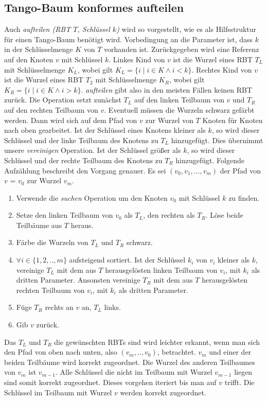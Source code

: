 \documentclass[a4paper,12pt]{article}
\begin{document}
\subsection{Tango-Baum konformes aufteilen}
Auch \textit{aufteilen (RBT $T$, Schlüssel $k$)} wird so vorgestellt, wie es als Hilfsstruktur für einen Tango-Baum benötigt wird. Vorbedingung an die Parameter ist, dass $k$ in der Schlüsselmenge $K$ von $T$ vorhanden ist. Zurückgegeben wird eine Referenz auf den Knoten $v$ mit Schlüssel $k$. Linkes Kind von $v$ ist die Wurzel eines RBT $T_L$ mit Schlüsselmenge $K_L$, wobei gilt ${K_L=\{i \mid  i\in K \land i <k\}}$. Rechtes Kind von $v$ ist die Wurzel eines RBT $T_2$ mit Schlüsselmenge $K_R$, wobei gilt ${K_R = \{i \mid i\in K \land i > k\}}$. \textit{aufteilen} gibt also in den meisten Fällen keinen RBT zurück. Die Operation setzt zunächst $T_L$ auf den linken Teilbaum von $v$ und $T_R$ auf den rechten Teilbaum von $v$. Eventuell müssen die Wurzeln schwarz gefärbt werden. Dann wird sich auf dem Pfad von $v$ zur Wurzel von $T$ Knoten für Knoten nach oben gearbeitet. Ist der Schlüssel eines Knotens kleiner als $k$, so wird dieser Schlüssel und der linke Teilbaum des Knotens zu $T_L$ hinzugefügt. Dies übernimmt unsere \textit{vereinigen} Operation. Ist der Schlüssel größer als $k$, so wird dieser Schlüssel und der rechte Teilbaum des Knotens zu $T_R$ hinzugefügt. Folgende Aufzählung beschreibt den Vorgang genauer.
Es sei $(v_0, v_1,...,v_m) $ der Pfad von $v$ = $v_0$ zur Wurzel $v_m$.
\begin{enumerate}
	\item Verwende die \textit{suchen} Operation um den Knoten $v_0$ mit Schlüssel $k$ zu finden.
	\item Setze den linken Teilbaum von $v_0$ als $T_L$, den rechten als $T_R$. Löse beide Teilbäume aus $T$ heraus.
	\item Färbe die Wurzeln von $T_L$ und $T_R$ schwarz.
	\item $\forall i \in \{1,2,..,m\}$ aufsteigend sortiert. Ist der Schlüssel $k_i$ von $v_i$ kleiner als $k$, vereinige $T_L$ mit dem aus $T$ herausgelösten linken Teilbaum von $v_i$, mit  $k_i$ als dritten Parameter. Ansonsten vereinige $T_R$ mit dem aus $T$ herausgelösten rechten Teilbaum von $v_i$, mit  $k_i$ als dritten Parameter. 
	\item Füge $T_R$ rechts an $v$ an, $T_L$ links.
	\item Gib $v$ zurück.
\end{enumerate}   
Das $T_L$ und $T_R$ die gewünschten RBTs sind wird leichter erkannt, wenn man sich den Pfad von oben nach unten, also $(v_m,..,v_0)$, betrachtet. $v_m$ und einer der beiden Teilbäume wird korrekt zugeordnet. Die Wurzel des anderen Teilbaumes von $v_m$ ist $v_{m-1}$. Alle Schlüssel die nicht im Teilbaum mit Wurzel $v_{m-1}$ liegen sind somit korrekt zugeordnet. Dieses vorgehen iteriert bis man auf $v$ trifft. Die Schlüssel im Teilbaum mit Wurzel $v$ werden korrekt zugeordnet. 
\end{document}
